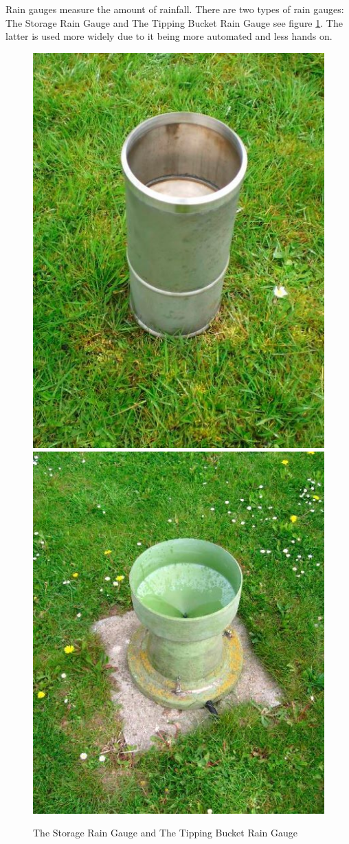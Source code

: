 Rain gauges measure the amount of rainfall. There are two types of rain gauges: The Storage Rain Gauge and The Tipping Bucket Rain Gauge see figure \ref{Gauge}. The latter is used more widely due to it being more automated and less hands on.\cite{RainGauge}

\begin{figure}[h]
\centering
\includegraphics[scale=0.2]{img/storageRainGauge.jpg}
\includegraphics[scale=0.2]{img/tippingBucketGauge.jpg}
\caption{The Storage Rain Gauge and The Tipping Bucket Rain Gauge}
\label{Gauge}
\end{figure}

